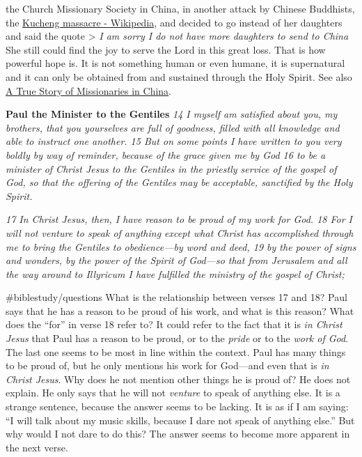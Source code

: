 the Church Missionary Society in China, in another attack by Chinese
Buddhists, the
\href{\%5Bhttps://en.wikipedia.org/wiki/Kucheng_massacre\%5D(https://en.wikipedia.org/wiki/Kucheng_massacre)}{Kucheng
massacre - Wikipedia}, and decided to go instead of her daughters and
said the quote \textgreater{} \emph{I am sorry I do not have more
daughters to send to China}\\
She still could find the joy to serve the Lord in this great loss. That
is how powerful hope is. It is not something human or even humane, it is
supernatural and it can only be obtained from and sustained through the
Holy Spirit. See also
\href{\%5Bhttps://www.youtube.com/watch?v=-DSjhwICEB4\%5D(https://www.youtube.com/watch?v=-DSjhwICEB4)}{A
True Story of Missionaries in China}.

\textbf{Paul the Minister to the Gentiles} \emph{14 I myself am
satisfied about you, my brothers, that you yourselves are full of
goodness, filled with all knowledge and able to instruct one another. 15
But on some points I have written to you very boldly by way of reminder,
because of the grace given me by God 16 to be a minister of Christ Jesus
to the Gentiles in the priestly service of the gospel of God, so that
the offering of the Gentiles may be acceptable, sanctified by the Holy
Spirit.}

\emph{17 In Christ Jesus, then, I have reason to be proud of my work for
God. 18 For I will not venture to speak of anything except what Christ
has accomplished through me to bring the Gentiles to obedience---by word
and deed, 19 by the power of signs and wonders, by the power of the
Spirit of God---so that from Jerusalem and all the way around to
Illyricum I have fulfilled the ministry of the gospel of Christ;}

\#biblestudy/questions What is the relationship between verses 17 and
18? Paul says that he has a reason to be proud of his work, and what is
this reason? What does the ``for'' in verse 18 refer to? It could refer
to the fact that it is \emph{in Christ Jesus} that Paul has a reason to
be proud, or to the \emph{pride} or to the \emph{work of God}. The last
one seems to be most in line within the context. Paul has many things to
be proud of, but he only mentions his work for God---and even that is
\emph{in Christ Jesus}. Why does he not mention other things he is proud
of? He does not explain. He only says that he will not \emph{venture} to
speak of anything else. It is a strange sentence, because the answer
seems to be lacking. It is as if I am saying: ``I will talk about my
music skills, because I dare not speak of anything else.'' But why would
I not dare to do this? The answer seems to become more apparent in the
next verse.

